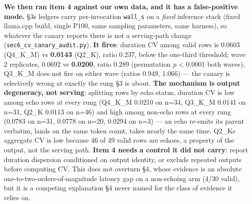 \begin{enumerate}
  \textbf{We then ran item 4 against our own data, and it has a false-positive mode.} §3\textquotesingle s ledgers carry per-invocation \texttt{wall\_s} on a \emph{fixed} inference stack (fixed llama.cpp build, single P100, same sampling parameters, same harness), so whatever the canary reports there is not a serving-path change (\texttt{sec6\_cv\_canary\_audit.py}). \textbf{It fires}: duration CV among valid rows is 0.0603 (Q4\_K\_M) vs \textbf{0.0143} (Q2\_K), ratio 0.237, below the one-third threshold; wave 2 replicates, 0.0692 vs \textbf{0.0200}, ratio 0.289 (permutation \emph{p} \textless{} 0.0001 both waves); Q3\_K\_M does not fire on either wave (ratios 0.949, 1.066) --- the canary is selectively wrong at exactly the rung §3 is about. \textbf{The mechanism is output degeneracy, not serving}: splitting rows by echo status, duration CV is low among echo rows at every rung (Q4\_K\_M 0.0210 on n=34, Q3\_K\_M 0.0141 on n=31, Q2\_K 0.0113 on n=46) and high among non-echo rows at every rung (0.0783 on n=31, 0.0778 on n=20, 0.0294 on n=3) --- an echo re-emits its parent verbatim, lands on the same token count, takes nearly the same time. Q2\_K\textquotesingle s aggregate CV is low because 46 of 49 valid rows are echoes, a property of the output, not the serving path. \textbf{Item 4 needs a control it did not carry}: report duration dispersion conditioned on output identity, or exclude repeated outputs before computing CV. This does not overturn §4, whose evidence is an absolute one-to-two-orders-of-magnitude latency gap on a non-echoing arm (4/30 valid), but it is a competing explanation §4 never named for the class of evidence it relies on.


\end{enumerate}
